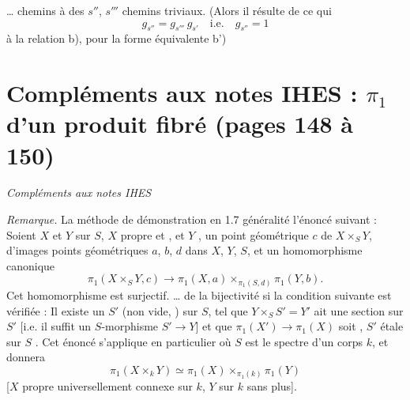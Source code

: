\documentclass[11pt,a4paper]{article}
\begin{document}
\ldots{} chemins \struck{\ill{}} à des $s''$, $s'''$ \struck{\ill{}}
chemins triviaux. (Alors il résulte de ce qui \ill{}
\[
g_{s''} = g_{s'''}\, g_{s'} \quad \text{i.e.} \quad g_{s''} = 1
\]
à la relation b), pour \ill{} la forme équivalente
b') \quad {}



\section*{Compléments aux notes IHES : $\pi_1$ d'un produit fibré (pages 148 à 150)}


\emph{Compléments aux notes IHES}


\emph{Remarque.} La méthode de démonstration \ill{} en 1.7 \ill{}
\ill{} généralité \ill{} l'énoncé suivant : Soient $X$ et $Y$ sur
$S$, $X$ propre et   \ill{},
et $Y$ \ill{}, 
 un point géométrique $c$ de $X \times_S Y$, d'images
points géométriques $a$, $b$, $d$ dans $X$, $Y$, $S$, et un
homomorphisme canonique
\[
\pi_1(X \times_S Y, c) \to \pi_1(X, a) \times_{\pi_1(S, d)} \pi_1(Y, b).
\]
Cet homomorphisme est surjectif.  \ldots{} de la bijectivité si
la condition suivante est vérifiée : Il existe
un $S'$ \struck{\ill{}} (non vide, \struck{\ill{}}) sur $S$, tel que
$Y \times_S S' = Y'$ ait une section sur $S'$ [i.e. 
il suffit un $S$-morphisme $S' \to Y$] 
\struck{\ill{}} et que
$\pi_1(X') \to \pi_1(X)$ soit , \ill{}
$S'$ étale sur $S$ \struck{\ill{}}. Cet énoncé
s'applique en particulier \ill{} \ill{} où $S$
est le spectre d'un corps $k$, et donnera
\[
\pi_1(X \times_k Y) \simeq \pi_1(X) \times_{\pi_1(k)} \pi_1(Y)
\]
[$X$ propre universellement connexe sur $k$, $Y$ \struck{\ill{}}
\ill{} sur $k$ sans plus].
\end{document}
